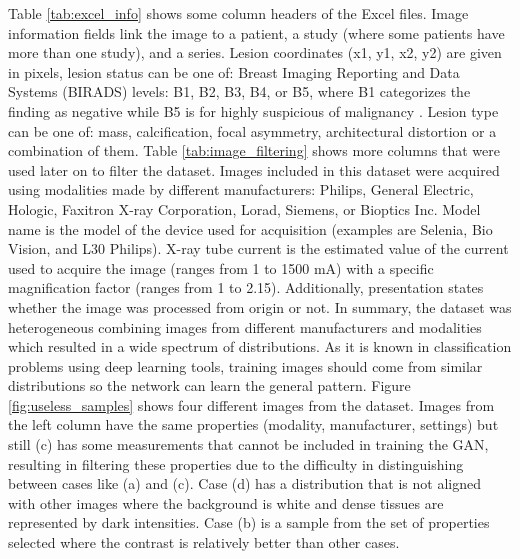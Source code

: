 \documentclass[final,3p,twocolumn,authoryear,sort&compress,times]{maia}
\begin{document}
Table \ref{tab:excel_info} shows some column headers of the Excel files. Image information fields link the image to a patient, a study (where some patients have more than one study), and a series. Lesion coordinates (x1, y1, x2, y2) are given in pixels, lesion status can be one of: Breast Imaging Reporting and Data Systems (BIRADS) levels: B1, B2, B3, B4, or B5, where B1 categorizes the finding as negative while B5 is for highly suspicious of malignancy \citep{BIRADS}. Lesion type can be one of: mass, calcification, focal asymmetry, architectural distortion or a combination of them. Table \ref{tab:image_filtering} shows more columns that were used later on to filter the dataset. Images included in this dataset were acquired using modalities made by different manufacturers: Philips, General Electric, Hologic, Faxitron X-ray Corporation, Lorad, Siemens, or Bioptics Inc. Model name is the model of the device used for acquisition (examples are Selenia, Bio Vision, and L30 Philips). X-ray tube current is the estimated value of the current used to acquire the image (ranges from 1 to 1500 mA) with a specific magnification factor (ranges from 1 to 2.15). Additionally, presentation states whether the image was processed from origin or not. In summary, the dataset was heterogeneous combining images from different manufacturers and modalities which resulted in a wide spectrum of distributions. As it is known in classification problems using deep learning tools, training images should come from similar distributions so the network can learn the general pattern. Figure \ref{fig:useless_samples} shows four different images from the dataset. Images from the left column have the same properties (modality, manufacturer, settings) but still (c) has some measurements that cannot be included in training the GAN, resulting in filtering these properties due to the difficulty in distinguishing between cases like (a) and (c). Case (d) has a distribution that is not aligned with other images where the background is white and dense tissues are represented by dark intensities. Case (b) is a sample from the set of properties selected where the contrast is relatively better than other cases.
\end{document}
